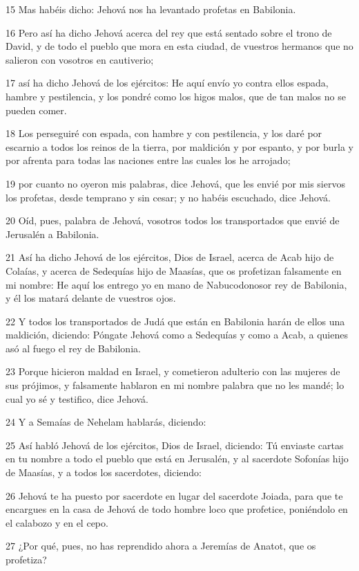 \par 15 Mas habéis dicho: Jehová nos ha levantado profetas en Babilonia.
\par 16 Pero así ha dicho Jehová acerca del rey que está sentado sobre el trono de David, y de todo el pueblo que mora en esta ciudad, de vuestros hermanos que no salieron con vosotros en cautiverio;
\par 17 así ha dicho Jehová de los ejércitos: He aquí envío yo contra ellos espada, hambre y pestilencia, y los pondré como los higos malos, que de tan malos no se pueden comer.
\par 18 Los perseguiré con espada, con hambre y con pestilencia, y los daré por escarnio a todos los reinos de la tierra, por maldición y por espanto, y por burla y por afrenta para todas las naciones entre las cuales los he arrojado;
\par 19 por cuanto no oyeron mis palabras, dice Jehová, que les envié por mis siervos los profetas, desde temprano y sin cesar; y no habéis escuchado, dice Jehová.
\par 20 Oíd, pues, palabra de Jehová, vosotros todos los transportados que envié de Jerusalén a Babilonia.
\par 21 Así ha dicho Jehová de los ejércitos, Dios de Israel, acerca de Acab hijo de Colaías, y acerca de Sedequías hijo de Maasías, que os profetizan falsamente en mi nombre: He aquí los entrego yo en mano de Nabucodonosor rey de Babilonia, y él los matará delante de vuestros ojos.
\par 22 Y todos los transportados de Judá que están en Babilonia harán de ellos una maldición, diciendo: Póngate Jehová como a Sedequías y como a Acab, a quienes asó al fuego el rey de Babilonia.
\par 23 Porque hicieron maldad en Israel, y cometieron adulterio con las mujeres de sus prójimos, y falsamente hablaron en mi nombre palabra que no les mandé; lo cual yo sé y testifico, dice Jehová.
\par 24 Y a Semaías de Nehelam hablarás, diciendo:
\par 25 Así habló Jehová de los ejércitos, Dios de Israel, diciendo: Tú enviaste cartas en tu nombre a todo el pueblo que está en Jerusalén, y al sacerdote Sofonías hijo de Maasías, y a todos los sacerdotes, diciendo:
\par 26 Jehová te ha puesto por sacerdote en lugar del sacerdote Joiada, para que te encargues en la casa de Jehová de todo hombre loco que profetice, poniéndolo en el calabozo y en el cepo.
\par 27 ¿Por qué, pues, no has reprendido ahora a Jeremías de Anatot, que os profetiza?
